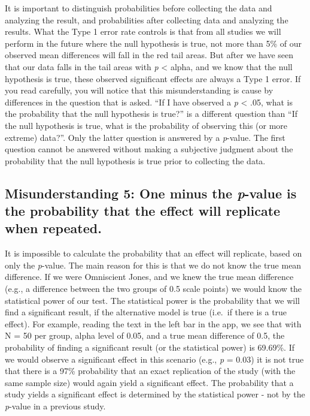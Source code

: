 \documentclass[
  oneside]{krantz}
\begin{document}
It is important to distinguish probabilities before collecting the data and analyzing the result, and probabilities after collecting data and analyzing the results. What the Type 1 error rate controls is that from all studies we will perform in the future where the null hypothesis is true, not more than 5\% of our observed mean differences will fall in the red tail areas. But after we have seen that our data falls in the tail areas with \emph{p} \textless{} alpha, and we know that the null hypothesis is true, these observed significant effects are always a Type 1 error. If you read carefully, you will notice that this misunderstanding is cause by differences in the question that is asked. ``If I have observed a \emph{p} \textless{} .05, what is the probability that the null hypothesis is true?'' is a different question than ``If the null hypothesis is true, what is the probability of observing this (or more extreme) data?''. Only the latter question is answered by a \emph{p}-value. The first question cannot be answered without making a subjective judgment about the probability that the null hypothesis is true prior to collecting the data.

\hypertarget{misunderstanding-5-one-minus-the-p-value-is-the-probability-that-the-effect-will-replicate-when-repeated.}{%
\subsection{\texorpdfstring{Misunderstanding 5: One minus the \emph{p}-value is the probability that the effect will replicate when repeated.}{Misunderstanding 5: One minus the p-value is the probability that the effect will replicate when repeated.}}\label{misunderstanding-5-one-minus-the-p-value-is-the-probability-that-the-effect-will-replicate-when-repeated.}}

It is impossible to calculate the probability that an effect will replicate, based on only the \emph{p}-value. The main reason for this is that we do not know the true mean difference. If we were Omniscient Jones, and we knew the true mean difference (e.g., a difference between the two groups of 0.5 scale points) we would know the statistical power of our test. The statistical power is the probability that we will find a significant result, if the alternative model is true (i.e.~if there is a true effect). For example, reading the text in the left bar in the app, we see that with N = 50 per group, alpha level of 0.05, and a true mean difference of 0.5, the probability of finding a significant result (or the statistical power) is 69.69\%. If we would observe a significant effect in this scenario (e.g., \emph{p} = 0.03) it is not true that there is a 97\% probability that an exact replication of the study (with the same sample size) would again yield a significant effect. The probability that a study yields a significant effect is determined by the statistical power - not by the \emph{p}-value in a previous study.
\end{document}
